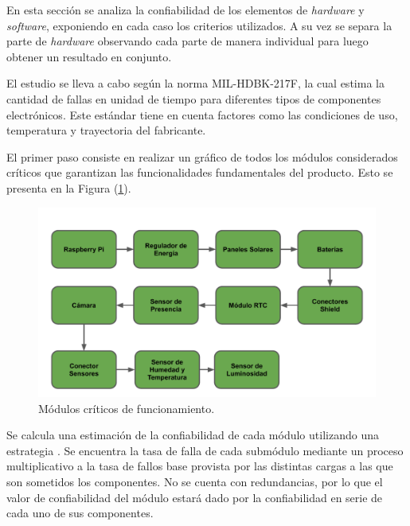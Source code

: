 %

%

En esta sección se analiza la confiabilidad de los elementos de \textit{hardware} y \textit{software}, exponiendo en cada caso los criterios utilizados. A su vez se separa la parte de \textit{hardware} observando cada parte de manera individual para luego obtener un resultado en conjunto.

El estudio se lleva a cabo según la norma MIL-HDBK-217F, la cual estima la cantidad de fallas en unidad de tiempo para diferentes tipos de componentes electrónicos. Este estándar tiene en cuenta factores como las condiciones de uso, temperatura y trayectoria del fabricante.

El primer paso consiste en realizar un gráfico de todos los módulos considerados críticos que garantizan las funcionalidades fundamentales del producto. Esto se presenta en la Figura (\ref{fig:criticos}).
\begin{figure}[H]
	\centering
	\includegraphics[width=0.9\linewidth,page=1]{ImagenesEstudios/ModulosCriticos}		
	\caption{Módulos críticos de funcionamiento.}
	\label{fig:criticos}
\end{figure}
Se calcula una estimación de la confiabilidad de cada módulo utilizando una estrategia . Se encuentra la tasa de falla de cada submódulo mediante un proceso multiplicativo a la tasa de fallos base provista por las distintas cargas a las que son sometidos los componentes.
No se cuenta con redundancias, por lo que el valor de confiabilidad del módulo estará dado por la confiabilidad en serie de cada uno de sus componentes.

